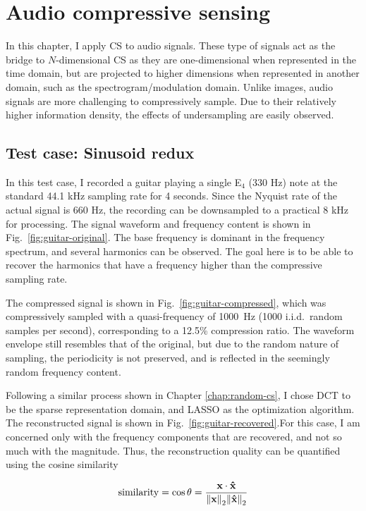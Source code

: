 \chapter{Audio compressive sensing}
\label{chap:audio-cs}
In this chapter, I apply CS to audio signals. These type of signals act as the bridge to $N$-dimensional CS as they are one-dimensional when represented in the time domain, but are projected to higher dimensions when represented in another domain, such as the spectrogram/modulation domain. Unlike images, audio signals are more challenging to compressively sample. Due to their relatively higher information density, the effects of undersampling are easily observed.

\section{Test case: Sinusoid redux}
\label{sec:audio-sine}
In this test case, I recorded a guitar playing a single E$_4$ (330 Hz) note at the standard 44.1 kHz sampling rate for 4 seconds. Since the Nyquist rate of the actual signal is 660 Hz, the recording can be downsampled to a practical 8 kHz for processing. The signal waveform and frequency content is shown in Fig.~\ref{fig:guitar-original}. The base frequency is dominant in the frequency spectrum, and several harmonics can be observed. The goal here is to be able to recover the harmonics that have a frequency higher than the compressive sampling rate.

The compressed signal is shown in Fig.~\ref{fig:guitar-compressed}, which was compressively sampled with a quasi-frequency of 1000~Hz (1000 i.i.d.~random samples per second), corresponding to a 12.5\% compression ratio. The waveform envelope still resembles that of the original, but due to the random nature of sampling, the periodicity is not preserved, and is reflected in the seemingly random frequency content.

Following a similar process shown in Chapter \ref{chap:random-cs}, I chose DCT to be the sparse representation domain, and LASSO as the optimization algorithm. The reconstructed signal is shown in Fig.~\ref{fig:guitar-recovered}.For this case, I am concerned only with the frequency components that are recovered, and not so much with the magnitude. Thus, the reconstruction quality can be quantified using the cosine similarity

\begin{equation}
	\label{eq:cossim}
	\mathrm{similarity} = \cos\theta = \frac{\text{\bfseries x} \cdot \bm\hat{\text{\bfseries x}}}{\norm{\text{\bfseries x}}_2 \norm{\bm\hat{\text{\bfseries x}}}_2}
\end{equation}

